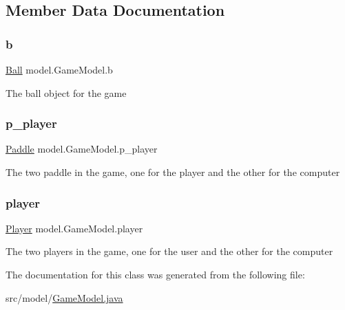 \subsection{Member Data Documentation}
\hypertarget{classmodel_1_1_game_model_a1b56c649031a3fb9c0b2930edf719de3}{}\label{classmodel_1_1_game_model_a1b56c649031a3fb9c0b2930edf719de3} 
\subsubsection{\texorpdfstring{b}{b}}
{\footnotesize\ttfamily \hyperlink{classmodel_1_1_ball}{Ball} model.\+Game\+Model.\+b\hspace{0.3cm}{\ttfamily [private]}}

The ball object for the game \hypertarget{classmodel_1_1_game_model_a46b846cead279b52545bb014f946fe47}{}\label{classmodel_1_1_game_model_a46b846cead279b52545bb014f946fe47} 
\subsubsection{\texorpdfstring{p\+\_\+player}{p\_player}}
{\footnotesize\ttfamily \hyperlink{classmodel_1_1_paddle}{Paddle} model.\+Game\+Model.\+p\+\_\+player\hspace{0.3cm}{\ttfamily [private]}}

The two paddle in the game, one for the player and the other for the computer \hypertarget{classmodel_1_1_game_model_aa7997c685bdb47e1af57ea496f4128c0}{}\label{classmodel_1_1_game_model_aa7997c685bdb47e1af57ea496f4128c0} 
\subsubsection{\texorpdfstring{player}{player}}
{\footnotesize\ttfamily \hyperlink{classmodel_1_1_player}{Player} model.\+Game\+Model.\+player\hspace{0.3cm}{\ttfamily [private]}}

The two players in the game, one for the user and the other for the computer 

The documentation for this class was generated from the following file\+:\begin{DoxyCompactItemize}
\item 
src/model/\hyperlink{_game_model_8java}{Game\+Model.\+java}\end{DoxyCompactItemize}
